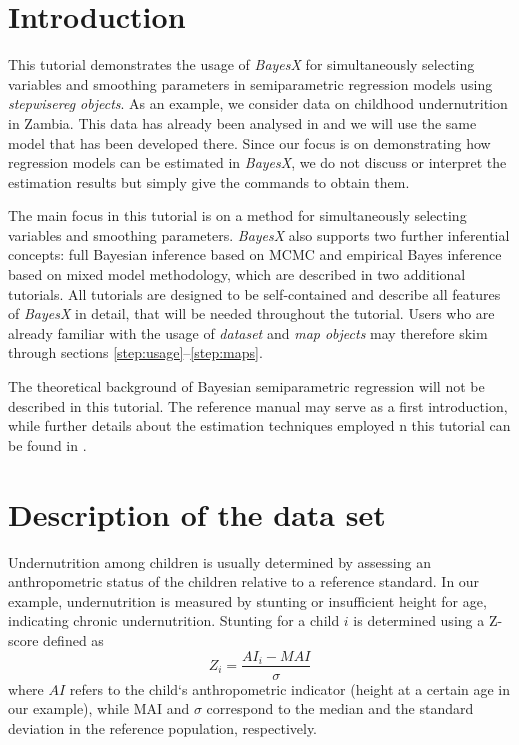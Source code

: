\section{Introduction}

This tutorial demonstrates the usage of {\it BayesX} for simultaneously selecting variables and smoothing parameters in
semiparametric regression models using {\it stepwisereg objects}. As an example, we consider data on childhood undernutrition
in Zambia. This data has already been analysed in  and we will use the same model that has been developed
there. Since our focus is on demonstrating how regression models can be estimated in {\it BayesX}, we do not discuss or
interpret the estimation results but simply give the commands to obtain them.

The main focus in this tutorial is on a method for simultaneously selecting variables and smoothing parameters. {\it BayesX}
also supports two further inferential concepts: full Bayesian inference based on MCMC and empirical Bayes inference based on
mixed model methodology, which are described in two additional tutorials. All tutorials are designed to be self-contained and
describe all features of {\it BayesX} in detail, that will be needed throughout the tutorial. Users who are already familiar
with the usage of {\it dataset} and {\it map objects} may therefore skim through sections \ref{step:usage}--\ref{step:maps}.

The theoretical background of Bayesian semiparametric regression will not be described in this tutorial. The reference manual
may serve as a first introduction, while further details about the estimation techniques employed n this tutorial can be found
in .

\section{Description of the data set}

Undernutrition among children is usually determined by assessing an anthropometric status of the children relative to a
reference standard. In our example, undernutrition is measured by stunting or insufficient height for age, indicating chronic
undernutrition. Stunting for a child $i$ is determined using a Z-score defined as
\[
Z_i = \frac{AI_i-MAI}{\sigma}
\]
where $AI$ refers to the child`s anthropometric indicator (height at a certain age in our example), while MAI and $\sigma$
correspond to the median and the standard deviation in the reference population, respectively.

